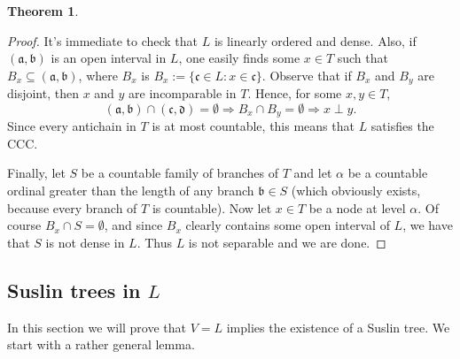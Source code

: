 \documentclass[12pt,a4paper]{report}
\theoremstyle{definition}
\newtheorem{theorem}{Theorem}[chapter] %
\theoremstyle{num.custom-title}
\DeclareMathOperator{\imp}{\Rightarrow}
\DeclareMathOperator{\sse}{\subseteq}
\begin{document}
\begin{theorem}
\begin{proof}
It's immediate to check that $L$ is linearly ordered and dense. Also, if $(\mathfrak{a},\mathfrak{b})$ is an open interval in $L$, one easily finds some $x \in T$ such that $B_x \sse (\mathfrak{a},\mathfrak{b})$, where $B_x$ is $B_x := \{\mathfrak{c} \in L : x \in \mathfrak{c}\}$. Observe that if $B_x$ and $B_y$ are disjoint, then $x$ and $y$ are incomparable in $T$. Hence, for some $x,y \in T$,
\[
(\mathfrak{a},\mathfrak{b}) \cap (\mathfrak{c},\mathfrak{d}) = \emptyset \imp B_x \cap B_y = \emptyset \imp x \perp y.
\]
Since every antichain in $T$ is at most countable, this means that $L$ satisfies the CCC.

Finally, let $S$ be a countable family of branches of $T$ and let $\alpha$ be a countable ordinal greater than the length of any branch $\mathfrak{b} \in S$ (which obviously exists, because every branch of $T$ is countable). Now let $x \in T$ be a node at level $\alpha$. Of course $B_x \cap S = \emptyset$, and since $B_x$ clearly contains some open interval of $L$, we have that $S$ is not dense in $L$. Thus $L$ is not separable and we are done.
\end{proof}
\end{theorem}


\subsection{Suslin trees in $L$}

In this section we will prove that $V=L$ implies the existence of a Suslin tree. We start with a rather general lemma.
\end{document}
